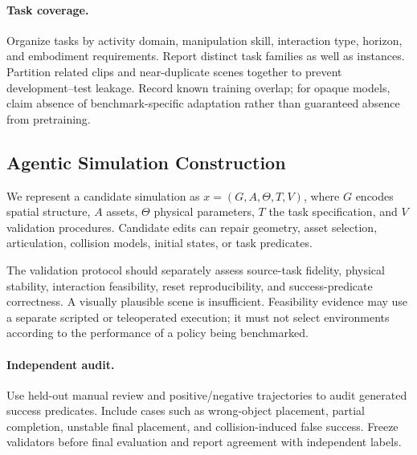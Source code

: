 \paragraph{Task coverage.}
Organize tasks by activity domain, manipulation skill, interaction type, horizon, and embodiment requirements. Report distinct task families as well as instances. Partition related clips and near-duplicate scenes together to prevent development--test leakage. Record known training overlap; for opaque models, claim absence of benchmark-specific adaptation rather than guaranteed absence from pretraining.

\subsection{Agentic Simulation Construction}
\label{sec:gb_search}
We represent a candidate simulation as $x=(G,A,\Theta,T,V)$, where $G$ encodes spatial structure, $A$ assets, $\Theta$ physical parameters, $T$ the task specification, and $V$ validation procedures. Candidate edits can repair geometry, asset selection, articulation, collision models, initial states, or task predicates.


The validation protocol should separately assess source-task fidelity, physical stability, interaction feasibility, reset reproducibility, and success-predicate correctness. A visually plausible scene is insufficient. Feasibility evidence may use a separate scripted or teleoperated execution; it must not select environments according to the performance of a policy being benchmarked.

\paragraph{Independent audit.}
Use held-out manual review and positive/negative trajectories to audit generated success predicates. Include cases such as wrong-object placement, partial completion, unstable final placement, and collision-induced false success. Freeze validators before final evaluation and report agreement with independent labels.

